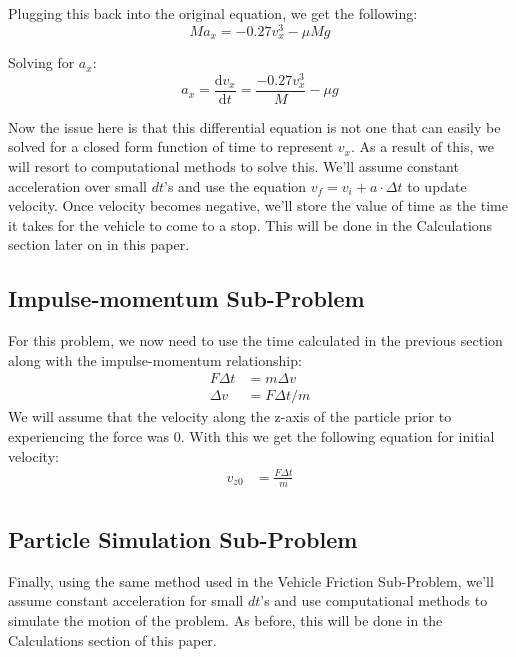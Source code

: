 \documentclass[10pt,letterpaper]{article}
\begin{document}
   	Plugging this back into the original equation, we get the following:
   	\begin{equation*}
		Ma_x=-0.27v_x^3-\mu Mg
   	\end{equation*}
   	
	Solving for $a_x$:
	\begin{equation*}
		a_x=\frac{\textrm{d}v_x}{\textrm{d}t} = \frac{-0.27v_x^3}{M}-\mu g
	\end{equation*}
	
	Now the issue here is that this differential equation is not one that can easily be solved for a closed form function of time to represent $v_x$. As a result of this, we will resort to computational methods to solve this. We'll assume constant acceleration over small $dt$'s and use the equation $v_f=v_i+a\cdot \Delta t$ to update velocity. Once velocity becomes negative, we'll store the value of time as the time it takes for the vehicle to come to a stop. This will be done in the Calculations section later on in this paper.
	
	\subsection{Impulse-momentum Sub-Problem}
	
	For this problem, we now need to use the time calculated in the previous section along with the impulse-momentum relationship:
	\begin{align*}
		F\Delta t &= m\Delta v\\
		\Delta v &= F\Delta t/m
	\end{align*}
	We will assume that the velocity along the z-axis of the particle prior to experiencing the force was 0. With this we get the following equation for initial velocity:
	\begin{align*}
		v_{z0} &= \frac{F\Delta t}{m}\\
	\end{align*}
	
	\subsection{Particle Simulation Sub-Problem}
	
	Finally, using the same method used in the Vehicle Friction Sub-Problem, we'll assume constant acceleration for small $dt$'s and use computational methods to simulate the motion of the problem. As before, this will be done in the Calculations section of this paper.
	
\end{document}
